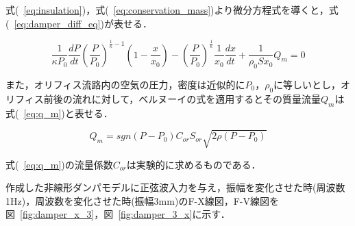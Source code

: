 \documentclass[a4paper,12pt]{article_vdlab_sotsuron}
\begin{document}
式(~\ref{eq:insulation})，式(~\ref{eq:conservation_mass})より微分方程式を導くと，式(~\ref{eq:damper_diff_eq})が表せる．

\begin{equation}
  \frac{1}{\kappa P_0} \frac{dP}{dt} \left(\frac{P}{P_0} \right)^{\frac{1}{\kappa} -1} \left(1 - \frac{x}{x_0} \right) - \left(\frac{P}{P_0} \right)^{\frac{1}{\kappa}} \frac{1}{x_0} \frac{dx}{dt} + \frac{1}{\rho_0 S x_0} Q_m = 0 \label{eq:damper_diff_eq}
\end{equation}

また，オリフィス流路内の空気の圧力，密度は近似的に$P_0$，$\rho_0$に等しいとし，オリフィス前後の流れに対して，ベルヌーイの式を適用するとその質量流量$Q_m$は式(~\ref{eq:q_m})と表せる．

\begin{equation}
  Q_m = sgn\left(P - P_0 \right)C_{or}S_{or}\sqrt{2 \rho \left(P-P_0 \right)} \label{eq:q_m}
\end{equation}

式(~\ref{eq:q_m})の流量係数$C_{or}$は実験的に求めるものである．

\newpage
作成した非線形ダンパモデルに正弦波入力を与え，振幅を変化させた時(周波数1Hz)，周波数を変化させた時(振幅3mm)のF-X線図，F-V線図を図~\ref{fig:damper_x_3}，図~\ref{fig:damper_3_x}に示す．
\end{document}

